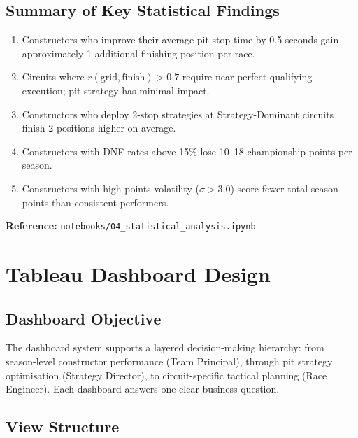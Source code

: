 \documentclass[12pt, a4paper]{article}
\begin{document}
\subsection{Summary of Key Statistical Findings}
\begin{enumerate}[noitemsep]
    \item Constructors who improve their average pit stop time by 0.5 seconds gain approximately 1 additional finishing position per race.
    \item Circuits where $r(\text{grid}, \text{finish}) > 0.7$ require near-perfect qualifying execution; pit strategy has minimal impact.
    \item Constructors who deploy 2-stop strategies at Strategy-Dominant circuits finish 2 positions higher on average.
    \item Constructors with DNF rates above 15\% lose 10--18 championship points per season.
    \item Constructors with high points volatility ($\sigma > 3.0$) score fewer total season points than consistent performers.
\end{enumerate}

\textbf{Reference:} \texttt{notebooks/04\_statistical\_analysis.ipynb}.

\newpage

\section{Tableau Dashboard Design}

\subsection{Dashboard Objective}
The dashboard system supports a layered decision-making hierarchy: from season-level constructor performance (Team Principal), through pit strategy optimisation (Strategy Director), to circuit-specific tactical planning (Race Engineer). Each dashboard answers one clear business question.

\subsection{View Structure}
\end{document}

